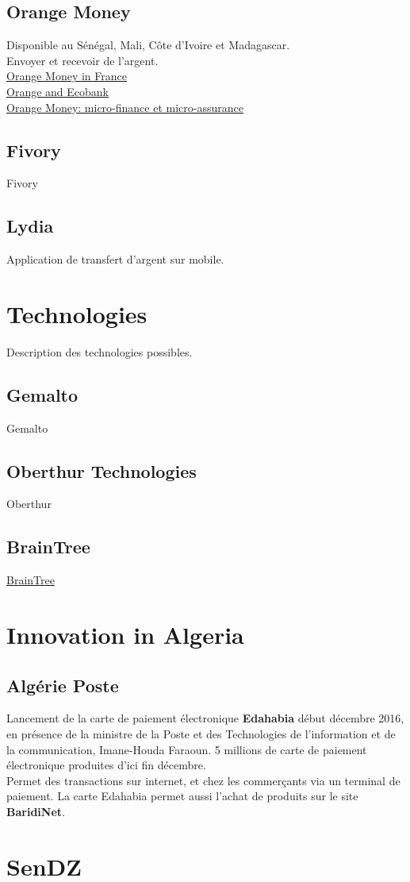 \documentclass{report}
\begin{document}
\section{Orange Money}
Disponible au Sénégal, Mali, Côte d'Ivoire et Madagascar. \\
Envoyer et recevoir de l'argent. \\
\href{http://www.orange.com/en/Press-and-medias/press-releases-2016/Orange-launches-Orange-Money-in-France-to-allow-money-transfers-to-three-countries-in-Africa-and-within-mainland-France}{Orange Money in France} \\
\href{http://www.orange.com/en/Press-and-medias/press-releases-2016/Orange-and-Ecobank-launch-a-bank-to-wallet-money-transfer-service-linked-to-Orange-Money-in-Cote-d-Ivoire-Guinea-Conakry-and-Niger}{Orange and Ecobank} \\
\href{http://www.jeuneafrique.com/355624/economie/orange-money-vise-de-nouveaux-partenariats-microfinance-microassurance/}{Orange Money: micro-finance et micro-assurance}
\section{Fivory}
Fivory
\section{Lydia}
Application de transfert d'argent sur mobile.

\chapter{Technologies}
Description des technologies possibles.
\section{Gemalto}
Gemalto
\section{Oberthur Technologies}
Oberthur
\section{BrainTree}
\href{https://www.braintreepayments.com/}{BrainTree}

\chapter{Innovation in Algeria}
\section{Algérie Poste}
Lancement de la carte de paiement électronique \textbf{Edahabia} début décembre 2016,
en présence de la ministre de la Poste et des Technologies de l'information et de la communication, Imane-Houda Faraoun.
5 millions de carte de paiement électronique produites d'ici fin décembre. \\
Permet des transactions sur internet, et chez les commerçants via un terminal de paiement.
La carte Edahabia permet aussi l'achat de produits sur le site \textbf{BaridiNet}.

\chapter{SenDZ}
\end{document}
